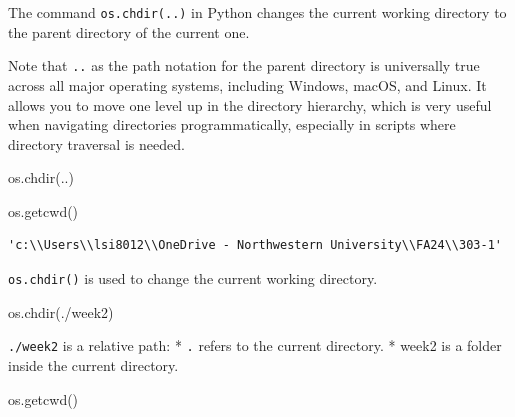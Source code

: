 \documentclass[
  letterpaper,
  DIV=11,
  numbers=noendperiod]{scrreprt}
\newenvironment{Shaded}{\begin{snugshade}}{\end{snugshade}}
\newcommand{\NormalTok}[1]{\textcolor[rgb]{0.00,0.23,0.31}{#1}}
\newcommand{\StringTok}[1]{\textcolor[rgb]{0.13,0.47,0.30}{#1}}
\begin{document}
The command \texttt{os.chdir(\textquotesingle{}..\textquotesingle{})} in
Python changes the current working directory to the parent directory of
the current one.

Note that \texttt{..} as the path notation for the parent directory is
universally true across all major operating systems, including Windows,
macOS, and Linux. It allows you to move one level up in the directory
hierarchy, which is very useful when navigating directories
programmatically, especially in scripts where directory traversal is
needed.

\begin{Shaded}
\begin{Highlighting}[]
\NormalTok{os.chdir(}\StringTok{\textquotesingle{}..\textquotesingle{}}\NormalTok{)}
\end{Highlighting}
\end{Shaded}

\begin{Shaded}
\begin{Highlighting}[]
\NormalTok{os.getcwd()}
\end{Highlighting}
\end{Shaded}

\begin{verbatim}
'c:\\Users\\lsi8012\\OneDrive - Northwestern University\\FA24\\303-1'
\end{verbatim}

\texttt{os.chdir()} is used to change the current working directory.

\begin{Shaded}
\begin{Highlighting}[]
\NormalTok{os.chdir(}\StringTok{\textquotesingle{}./week2\textquotesingle{}}\NormalTok{)}
\end{Highlighting}
\end{Shaded}

\texttt{./week2} is a relative path: * \texttt{.} refers to the current
directory. * week2 is a folder inside the current directory.

\begin{Shaded}
\begin{Highlighting}[]
\NormalTok{os.getcwd()}
\end{Highlighting}
\end{Shaded}
\end{document}
